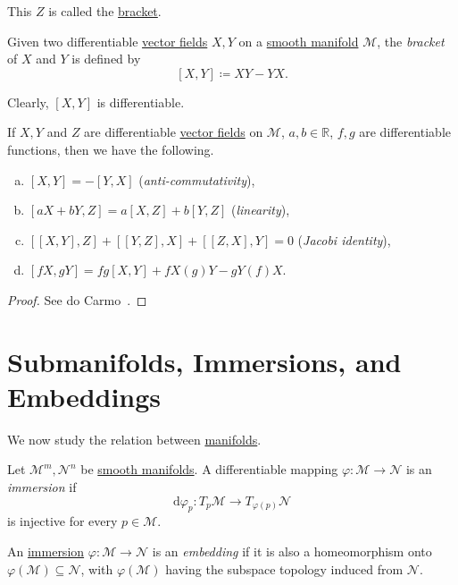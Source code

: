 This \(Z\) is called the \hyperref[def:bracket]{bracket}.

\begin{definition}[Bracket]\label{def:bracket}
	Given two differentiable \hyperref[def:vector-field]{vector fields} \(X, Y\) on a \hyperref[def:smooth-manifold]{smooth manifold} \(\mathcal{M} \), the \emph{bracket} of \(X\) and \(Y\) is defined by
	\[
		[X, Y] \coloneqq XY - YX.
	\]
\end{definition}

Clearly, \([X, Y]\) is differentiable.

\begin{proposition}
	If \(X, Y\) and \(Z\) are differentiable \hyperref[def:vector-field]{vector fields} on \(\mathcal{M} \), \(a, b\in \mathbb{R} \), \(f, g\) are differentiable functions, then we have the following.
	\begin{enumerate}[(a)]
		\item \([X, Y] = -[Y, X]\) (\emph{anti-commutativity}),
		\item \([aX + bY, Z] = a[X, Z] + b[Y, Z]\) (\emph{linearity}),
		\item \([[X, Y], Z] + [[Y, Z], X] + [[Z, X], Y] = 0\) (\emph{Jacobi identity}),
		\item \([fX, gY] = fg[X, Y] + fX(g)Y - gY(f)X\).
	\end{enumerate}
\end{proposition}
\begin{proof}
	See do Carmo~\cite[Chapter 0, Proposition 5.3]{flaherty2013riemannian}.
\end{proof}


\section{Submanifolds, Immersions, and Embeddings}
We now study the relation between \hyperref[def:smooth-manifold]{manifolds}.

\begin{definition}[Immersion]\label{def:immersion}
	Let \(\mathcal{M} ^m , \mathcal{N} ^n \) be \hyperref[def:smooth-manifold]{smooth manifolds}. A differentiable mapping \(\varphi \colon \mathcal{M} \to  \mathcal{N} \) is an \emph{immersion} if
	\[
		\mathrm{d} \varphi _p \colon T_p \mathcal{M} \to  T_{\varphi (p)} \mathcal{N}
	\]
	is injective for every \(p\in \mathcal{M} \).
\end{definition}

\begin{definition}[Embedding]\label{def:embedding}
	An \hyperref[def:immersion]{immersion} \(\varphi \colon \mathcal{M} \to \mathcal{N} \) is an \emph{embedding} if it is also a homeomorphism onto \(\varphi (\mathcal{M} )\subseteq \mathcal{N} \), with \(\varphi (\mathcal{M} )\) having the subspace topology induced from \(\mathcal{N} \).
\end{definition}

